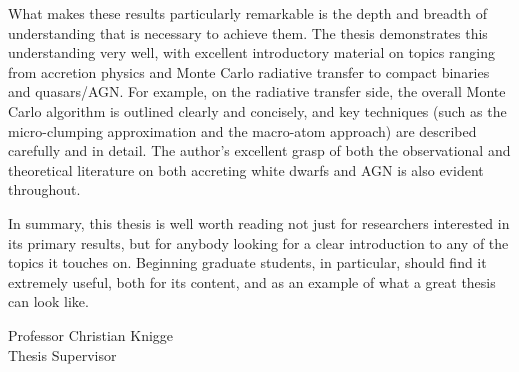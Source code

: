 \documentclass[a4paper, 11pt, twoside]{Thesis}  %
\begin{document}
{What makes these results particularly remarkable is the depth and
breadth of understanding that is necessary to achieve them. The thesis
demonstrates this understanding very well, with excellent introductory
material on topics ranging from accretion physics and Monte Carlo
radiative transfer to compact binaries and quasars/AGN. For example, on
the radiative transfer side, the overall Monte Carlo algorithm is
outlined clearly and concisely, and key techniques (such as the
micro-clumping approximation and the macro-atom approach) are described
carefully and in detail. The author's excellent grasp of both the
observational and theoretical literature on both accreting white dwarfs
and AGN is also evident throughout.

In summary, this thesis is well worth reading not just for researchers
interested in its primary results, but for anybody looking for a clear
introduction to any of the topics it touches on. Beginning graduate
students, in particular, should find it extremely useful, both for its
content, and as an example of what a great thesis can look like.

Professor Christian Knigge\\
Thesis Supervisor
}



\newpage %
\clearpage

\end{document}
